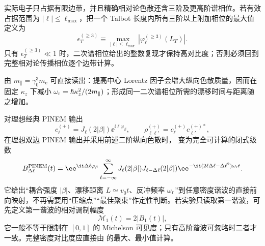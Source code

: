 实际电子只占据有限边带，并且精确相对论色散还含三阶及更高阶谱相位。若有效占据范围为 $|\ell|\le\ell_{\max}$，把一个 Talbot 长度内所有三阶以上附加相位的最大值定义为
\begin{equation}
 {
 \epsilon_T^{(\ge3)}
 \equiv
 \max_{|\ell|\le\ell_{\max}}
 \left|\varphi_\ell^{(\ge3)}(L_T)\right|.}
 \label{eq:electron-talbot-higher-order-control-dp76}
\end{equation}
只有 $\epsilon_T^{(\ge3)}\ll1$ 时，二次谱相位给出的整数复现才保持高对比度；否则必须回到完整相对论传播相位逐个边带计算。

由 $m_\parallel=\gamma_0^3m_{\mathrm e}$ 可直接读出：提高中心 Lorentz 因子会增大纵向色散质量，因而在固定 $\kappa_z$ 下减小 $\omega_{\rm r}=\hbar\kappa_z^2/(2m_\parallel)$；形成同一二次谱相位所需的漂移时间与距离随之增加。

对理想经典 PINEM 输出
\begin{equation*}
 c_\ell^{(+)}
 =J_\ell(2|\beta|)
 \ee^{\ii\ell\varphi_\beta},
 \qquad
 \rho_{\ell\ell'}^{(+)}=c_\ell^{(+)}c_{\ell'}^{(+)*},
\end{equation*}
在理想双边 PINEM 输出并采用前述二阶纵向色散时， 变为完全可计算的闭式级数
\begin{equation}
{
 B_{\Delta\ell}^{\rm PINEM}(t)
 =\ee^{\ii \Delta\ell\varphi_\beta}
 \sum_{\ell=-\infty}^{\infty}
 J_\ell(2|\beta|)J_{\ell-\Delta\ell}(2|\beta|)
 \ee^{-\ii(2\ell \Delta\ell-\Delta\ell^2)\omega_{\rm r}t}.}
\label{eq:pinem_bunching_exact_series_dp46}
\end{equation}
它给出“耦合强度 $|\beta|$、漂移距离 $L\simeq v_0t$、反冲频率 $\omega_{\rm r}$”到任意密度谐波的直接前向映射，不再需要用“压缩点”“最佳聚束”作定性判断。若实验只读取第一谐波，可先定义第一谐波的相对调制幅度
\begin{equation}
{\mathcal M_1(t)=2|B_1(t)|,}
\label{eq:first_harmonic_visibility_dp46}
\end{equation}
它一般不等于限制在 $[0,1]$ 的 Michelson 可见度；只有高阶谐波可忽略时二者才一致。完整密度对比度应直接由 的最大、最小值计算。


